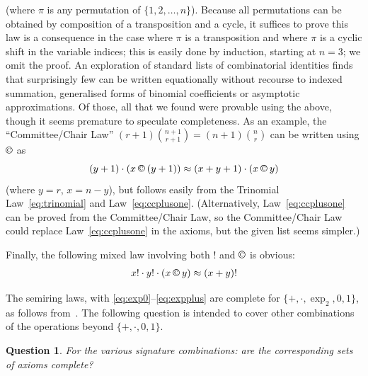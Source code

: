\documentclass[eqnor,reqno]{amsart}
\theoremstyle{plain}
\newtheorem{question}[thm]{Question}
\theoremstyle{definition}
\newcommand{\cc}{\mathbin{\textup{\copyright}}}
\newcommand{\up}[1]{\textup{#1}}
\begin{document}
(where $\pi$ is any permutation of $\{1,2,\dots,n\}$).  Because all permutations can be obtained by composition of a transposition and a cycle, it suffices to prove this law is a consequence in the case where $\pi$ is a transposition and where $\pi$ is a cyclic shift in the variable indices; this is easily done by induction, starting at $n=3$; we omit the proof.  An exploration of standard lists of combinatorial identities finds that surprisingly few can be written equationally without recourse to indexed summation, generalised forms of binomial coefficients or asymptotic approximations.  Of those, all that we found were provable using the above, though it seems premature to speculate completeness.  As an example, the ``Committee/Chair Law'' $(r+1)\binom{n+1}{r+1}=(n+1)\binom{n}{r}$ can be written using $\cc$ as 
\[
(y+1)\cdot (x\cc (y+1)) \approx (x+y+1)\cdot (x\cc y)
\]
 (where $y=r$, $x=n-y$), but follows easily from the Trinomial Law~\eqref{eq:trinomial} and Law~\eqref{eq:ccplusone}.  (Alternatively,  Law~\eqref{eq:ccplusone} can be proved from the Committee/Chair Law, so the Committee/Chair Law could replace Law~\eqref{eq:ccplusone} in the axioms, but the given list seems simpler.) 

Finally, the following mixed law involving both $!$ and $\cc$ is obvious:
\begin{align}
x!\cdot y!\cdot (x\cc y)\approx (x+y)!
\end{align}

The semiring laws, with \eqref{eq:exp0}--\eqref{eq:expplus} are complete for $\{+,\cdot,\exp_2,0,1\}$, as follows from~\cite{henrub}.  The following question is intended to cover other combinations of the operations beyond $\{+,\cdot,0,1\}$.
\begin{question}
For the various signature combinations\up: are the corresponding sets of axioms complete?
\end{question}



\end{document}
